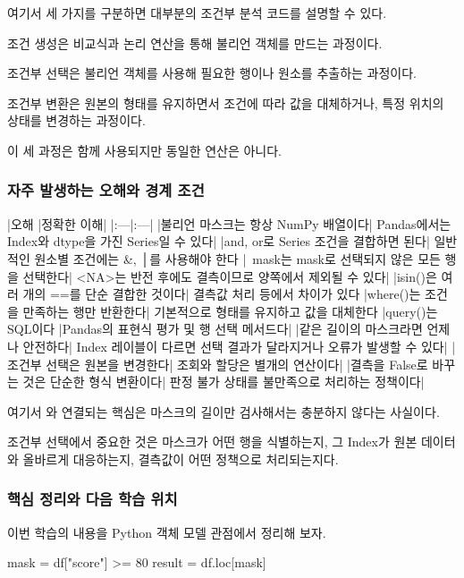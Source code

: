 여기서 세 가지를 구분하면 대부분의 조건부 분석 코드를 설명할 수 있다.

조건 생성은 비교식과 논리 연산을 통해 불리언 객체를 만드는 과정이다.

조건부 선택은 불리언 객체를 사용해 필요한 행이나 원소를 추출하는 과정이다.

조건부 변환은 원본의 형태를 유지하면서 조건에 따라 값을 대체하거나, 특정 위치의 상태를 변경하는 과정이다.

이 세 과정은 함께 사용되지만 동일한 연산은 아니다.

\subsubsection{자주 발생하는 오해와 경계 조건}

\begin{dhktable}
|오해	|정확한 이해|
|:---|:---|
|불리언 마스크는 항상 NumPy 배열이다|	Pandas에서는 Index와 dtype을 가진 Series일 수 있다|
|and, or로 Series 조건을 결합하면 된다|	일반적인 원소별 조건에는 &, │를 사용해야 한다
|~mask는 mask로 선택되지 않은 모든 행을 선택한다|	<NA>는 반전 후에도 결측이므로 양쪽에서 제외될 수 있다|
|isin()은 여러 개의 ==를 단순 결합한 것이다|	결측값 처리 등에서 차이가 있다
|where()는 조건을 만족하는 행만 반환한다|	기본적으로 형태를 유지하고 값을 대체한다
|query()는 SQL이다	|Pandas의 표현식 평가 및 행 선택 메서드다|
|같은 길이의 마스크라면 언제나 안전하다|	Index 레이블이 다르면 선택 결과가 달라지거나 오류가 발생할 수 있다|
|조건부 선택은 원본을 변경한다|	조회와 할당은 별개의 연산이다|
|결측을 False로 바꾸는 것은 단순한 형식 변환이다|	판정 불가 상태를 불만족으로 처리하는 정책이다|
\end{dhktable}

여기서 와 연결되는 핵심은 마스크의 길이만 검사해서는 충분하지 않다는 사실이다.

조건부 선택에서 중요한 것은 마스크가 어떤 행을 식별하는지, 그 Index가 원본 데이터와 올바르게 대응하는지, 결측값이 어떤 정책으로 처리되는지다.

\subsubsection{핵심 정리와 다음 학습 위치}

이번 학습의 내용을 Python 객체 모델 관점에서 정리해 보자.

\begin{dhkcode}
mask = df["score"] >= 80
result = df.loc[mask]
\end{dhkcode}

